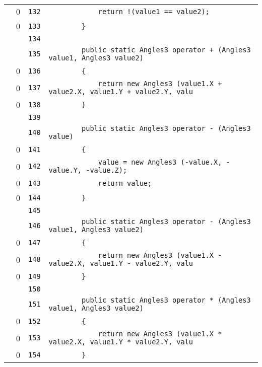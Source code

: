 \documentclass[a4paper,10pt]{article}
\begin{document}
\begin{longtable}[l]{lrrl}
\cellcolor{red} & 0 & \verb~132~ & \verb~            return !(value1 == value2);~\\
\cellcolor{red} & 0 & \verb~133~ & \verb~        }~\\
\cellcolor{gray} &  & \verb~134~ & \verb~~\\
\cellcolor{gray} &  & \verb~135~ & \verb~        public static Angles3 operator + (Angles3 value1, Angles3 value2)~\\
\cellcolor{red} & 0 & \verb~136~ & \verb~        {~\\
\cellcolor{red} & 0 & \verb~137~ & \verb~            return new Angles3 (value1.X + value2.X, value1.Y + value2.Y, valu~\\
\cellcolor{red} & 0 & \verb~138~ & \verb~        }~\\
\cellcolor{gray} &  & \verb~139~ & \verb~~\\
\cellcolor{gray} &  & \verb~140~ & \verb~        public static Angles3 operator - (Angles3 value)~\\
\cellcolor{red} & 0 & \verb~141~ & \verb~        {~\\
\cellcolor{red} & 0 & \verb~142~ & \verb~            value = new Angles3 (-value.X, -value.Y, -value.Z);~\\
\cellcolor{red} & 0 & \verb~143~ & \verb~            return value;~\\
\cellcolor{red} & 0 & \verb~144~ & \verb~        }~\\
\cellcolor{gray} &  & \verb~145~ & \verb~~\\
\cellcolor{gray} &  & \verb~146~ & \verb~        public static Angles3 operator - (Angles3 value1, Angles3 value2)~\\
\cellcolor{red} & 0 & \verb~147~ & \verb~        {~\\
\cellcolor{red} & 0 & \verb~148~ & \verb~            return new Angles3 (value1.X - value2.X, value1.Y - value2.Y, valu~\\
\cellcolor{red} & 0 & \verb~149~ & \verb~        }~\\
\cellcolor{gray} &  & \verb~150~ & \verb~~\\
\cellcolor{gray} &  & \verb~151~ & \verb~        public static Angles3 operator * (Angles3 value1, Angles3 value2)~\\
\cellcolor{red} & 0 & \verb~152~ & \verb~        {~\\
\cellcolor{red} & 0 & \verb~153~ & \verb~            return new Angles3 (value1.X * value2.X, value1.Y * value2.Y, valu~\\
\cellcolor{red} & 0 & \verb~154~ & \verb~        }~\\

\end{longtable}
\end{document}
